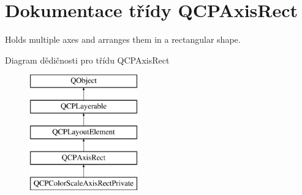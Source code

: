 \hypertarget{classQCPAxisRect}{}\section{Dokumentace třídy Q\+C\+P\+Axis\+Rect}
\label{classQCPAxisRect}


Holds multiple axes and arranges them in a rectangular shape.  


Diagram dědičnosti pro třídu Q\+C\+P\+Axis\+Rect\begin{figure}[H]
\begin{center}
\leavevmode
\includegraphics[height=5.000000cm]{classQCPAxisRect}
\end{center}
\end{figure}
